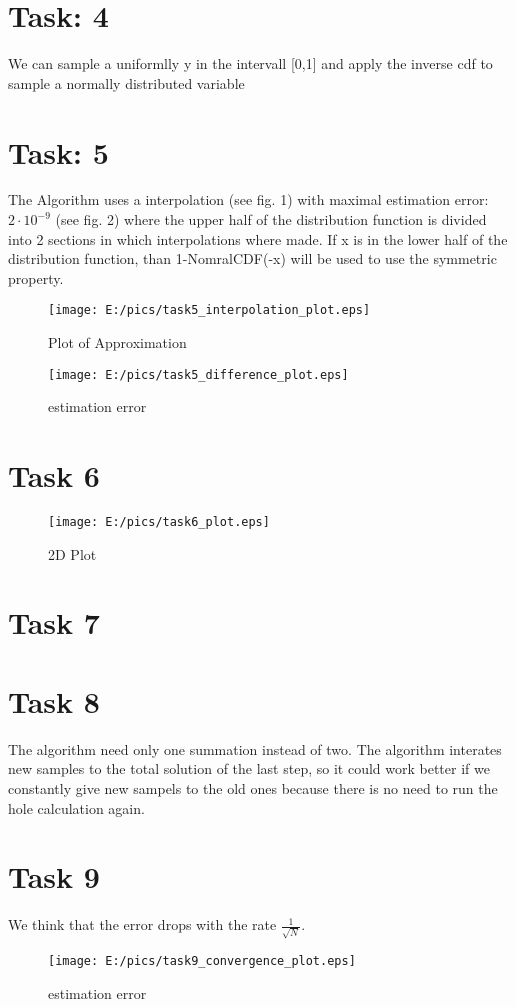 \documentclass{article}
\begin{document}
\section{Task: 4} %
We can sample a uniformlly y in the intervall [0,1] and apply the inverse cdf to sample a normally distributed variable

\newpage
\section{Task: 5} %
The Algorithm uses a interpolation (see fig. 1) with maximal estimation error: $2\cdot 10^{-9}$ (see fig. 2) where the upper half of the distribution function is divided into 2 sections in which interpolations where made. 
If x is in the lower half of the distribution function, than 1-NomralCDF(-x) will be used to use the symmetric property.
\begin{figure}[htbp]
	\centering
		\texttt{[image: E:/pics/task5\_interpolation\_plot.eps]}
		\caption{Plot of Approximation}
	\label{fig:task5_interpolation_plot}
\end{figure}
\begin{figure}[htbp]
	\centering
		\texttt{[image: E:/pics/task5\_difference\_plot.eps]}
	\caption{estimation error}
	\label{fig:task5_difference_plot}
\end{figure}

\newpage
\section{Task 6}
\begin{figure}[htbp]
	\centering
		\texttt{[image: E:/pics/task6\_plot.eps]}
	\caption{2D Plot}
	\label{fig:task6_plot}
\end{figure}

\section{Task 7}

\section{Task 8}
The algorithm need only one summation instead of two. The algorithm interates new samples to the total solution of the last step, so it could work better if we constantly give new sampels to the old ones because there is no need to run the hole calculation again. 

\section{Task 9}
We think that the error drops with the rate $\frac{1}{\sqrt{N}}$.
\begin{figure}[htbp]
	\centering
		\texttt{[image: E:/pics/task9\_convergence\_plot.eps]}
	\caption{estimation error}
	\label{fig:task9_convergence_plot}
\end{figure}
\end{document}
